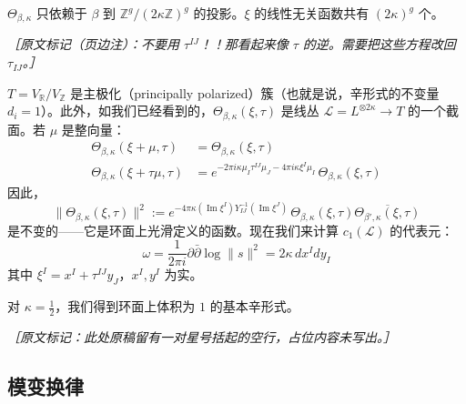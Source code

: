 $\Theta_{\beta,\kappa}$ 只依赖于 $\beta$ 到 $\mathbb{Z}^g/(2\kappa\mathbb{Z})^g$ 的投影。$\xi$ 的线性无关函数共有 $(2\kappa)^g$ 个。

{\small\itshape ［原文标记（页边注）：不要用 $\tau^{IJ}$！！那看起来像 $\tau$ 的逆。需要把这些方程改回 $\tau_{IJ}$。］}

$T = V_{\mathbb{R}}/V_{\mathbb{Z}}$ 是主极化（principally polarized）簇（也就是说，辛形式的不变量 $d_i = 1$）。此外，如我们已经看到的，$\Theta_{\beta,\kappa}(\xi,\tau)$ 是线丛 $\mathcal{L} = L^{\otimes 2\kappa}\to T$ 的一个截面。若 $\mu$ 是整向量：
\begin{equation}
\begin{aligned}
  \Theta_{\beta,\kappa}(\xi+\mu,\tau) &= \Theta_{\beta,\kappa}(\xi,\tau)\\
  \Theta_{\beta,\kappa}(\xi+\tau\mu,\tau)
  &= e^{-2\pi i\kappa\mu_I\tau^{IJ}\mu_J - 4\pi i\kappa\xi^I\mu_I}
     \,\Theta_{\beta,\kappa}(\xi,\tau)
\end{aligned}
\tag{E.66}
\label{eq:E.66}
\end{equation}
因此，
\begin{equation}
  \|\Theta_{\beta,\kappa}(\xi,\tau)\|^2
  := e^{-4\pi\kappa(\operatorname{Im}\xi^I)Y_{IJ}^{-1}(\operatorname{Im}\xi^J)}
     \,\Theta_{\beta,\kappa}(\xi,\tau)\overline{\Theta_{\beta',\kappa}(\xi,\tau)}
  \tag{E.67}
  \label{eq:E.67}
\end{equation}
是不变的——它是环面上光滑定义的函数。现在我们来计算 $c_1(\mathcal{L})$ 的代表元：
\begin{equation}
  \omega = \frac{1}{2\pi i}\partial\bar\partial\log\|s\|^2 = 2\kappa\,dx^I dy_I
  \tag{E.68}
  \label{eq:E.68}
\end{equation}
其中 $\xi^I = x^I + \tau^{IJ}y_J$，$x^I,y^I$ 为实。

对 $\kappa = \frac{1}{2}$，我们得到环面上体积为 $1$ 的基本辛形式。

{\small\itshape ［原文标记：此处原稿留有一对星号括起的空行，占位内容未写出。］}

\subsection{模变换律} %

